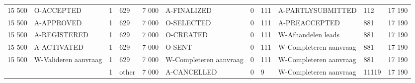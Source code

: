 \begin{tabular}{llllllllllr}
15 500 & O-ACCEPTED & 1 & 629 & 7 000 & A-FINALIZED & 0 & 111 & A-PARTLYSUBMITTED & 112 & 17 190 \\
15 500 & A-APPROVED & 1 & 629 & 7 000 & O-SELECTED & 0 & 111 & A-PREACCEPTED & 881 & 17 190 \\
15 500 & A-REGISTERED & 1 & 629 & 7 000 & O-CREATED & 0 & 111 & W-Afhandelen leads & 881 & 17 190 \\
15 500 & A-ACTIVATED & 1 & 629 & 7 000 & O-SENT & 0 & 111 & W-Completeren aanvraag & 881 & 17 190 \\
15 500 & W-Valideren aanvraag & 1 & 629 & 7 000 & W-Completeren aanvraag & 0 & 111 & W-Completeren aanvraag & 881 & 17 190 \\
 &  & 1 & other & 7 000 & A-CANCELLED & 0 & 9 & W-Completeren aanvraag & 11119 & 17 190 \\
\bottomrule
\end{tabular}
